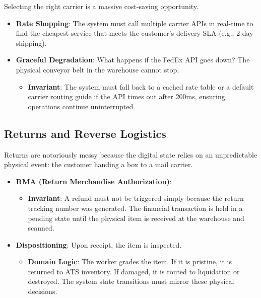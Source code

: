 Selecting the right carrier is a massive cost-saving opportunity.

\begin{itemize}
\tightlist
\item
  \textbf{Rate Shopping}: The system must call multiple carrier APIs in
  real-time to find the cheapest service that meets the customer's
  delivery SLA (e.g., 2-day shipping).
\item
  \textbf{Graceful Degradation}: What happens if the FedEx API goes
  down? The physical conveyor belt in the warehouse cannot stop.

  \begin{itemize}
  \tightlist
  \item
    \textbf{Invariant}: The system must fall back to a cached rate table
    or a default carrier routing guide if the API times out after 200ms,
    ensuring operations continue uninterrupted.
  \end{itemize}
\end{itemize}

\subsection{Returns and Reverse
Logistics}\label{returns-and-reverse-logistics}

Returns are notoriously messy because the digital state relies on an
unpredictable physical event: the customer handing a box to a mail
carrier.

\begin{itemize}
\tightlist
\item
  \textbf{RMA (Return Merchandise Authorization)}:

  \begin{itemize}
  \tightlist
  \item
    \textbf{Invariant}: A refund must not be triggered simply because
    the return tracking number was generated. The financial transaction
    is held in a pending state until the physical item is received at
    the warehouse and scanned.
  \end{itemize}
\item
  \textbf{Dispositioning}: Upon receipt, the item is inspected.

  \begin{itemize}
  \tightlist
  \item
    \textbf{Domain Logic}: The worker grades the item. If it is
    pristine, it is returned to ATS inventory. If damaged, it is routed
    to liquidation or destroyed. The system state transitions must
    mirror these physical decisions.
  \end{itemize}
\end{itemize}

